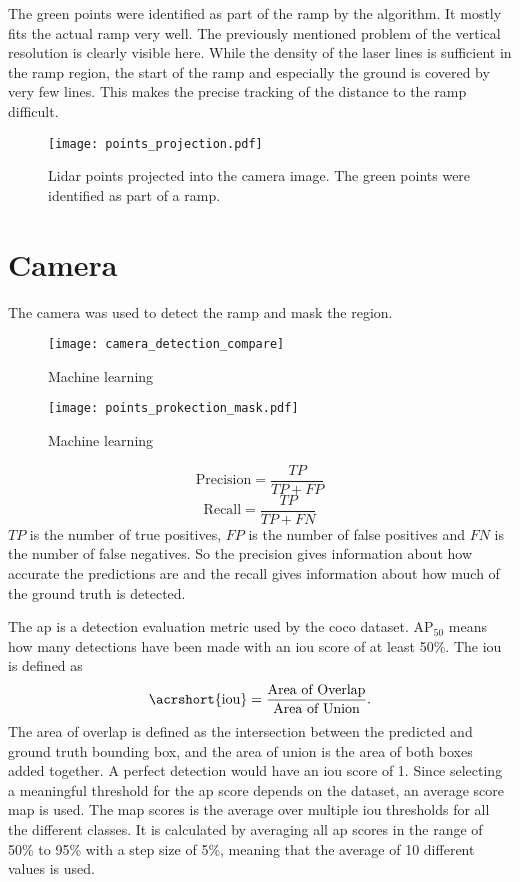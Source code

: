 The green points were identified as part of the ramp by the algorithm.
It mostly fits the actual ramp very well.
The previously mentioned problem of the vertical resolution is clearly visible here.
While the density of the laser lines is sufficient in the ramp region, the start of the ramp and especially the ground is covered by very few lines.
This makes the precise tracking of the distance to the ramp difficult.
\begin{figure}[htbp]
	\centering
	\texttt{[image: points\_projection.pdf]}
	\caption{Lidar points projected into the camera image. The green points were identified as part of a ramp.}
	\label{fig:points_projection}
\end{figure}



\section{Camera}
The camera was used to detect the ramp and mask the region.
\begin{figure}[htbp]
	\centering
	\texttt{[image: camera\_detection\_compare]}
	\caption{Machine learning}
	\label{fig:camera_detection_compare}
\end{figure}
\begin{figure}[htbp]
	\centering
	\texttt{[image: points\_prokection\_mask.pdf]}
	\caption{Machine learning}
	\label{fig:points_prokection_mask}
\end{figure}
\begin{equation}
	\text{Precision} = \frac{TP}{TP+FP}
\end{equation}
\begin{equation}
	\text{Recall} = \frac{TP}{TP+FN}
\end{equation}
$TP$ is the number of true positives, $FP$ is the number of false positives and $FN$ is the number of false negatives.
So the precision gives information about how accurate the predictions are and the recall gives information about how much of the ground truth is detected.

The \gls{ap} is a detection evaluation metric used by the \gls{coco} dataset.
$\text{AP}_{50}$ means how many detections have been made with an \gls{iou} score of at least 50\%.
The \gls{iou} is defined as
\begin{equation}
	\text{\acrshort{iou}} = \frac{\text{Area of Overlap}}{\text{Area of Union}}.
\end{equation}
The area of overlap is defined as the intersection between the predicted and ground truth bounding box, and the area of union is the area of both boxes added together.
A perfect detection would have an \gls{iou} score of 1.
Since selecting a meaningful threshold for the \gls{ap} score depends on the dataset, an average score \gls{map} is used.
The \gls{map} scores is the average over multiple \gls{iou} thresholds for all the different classes.
It is calculated by averaging all \gls{ap} scores in the range of 50\% to 95\% with a step size of 5\%, meaning that the average of 10 different values is used.

